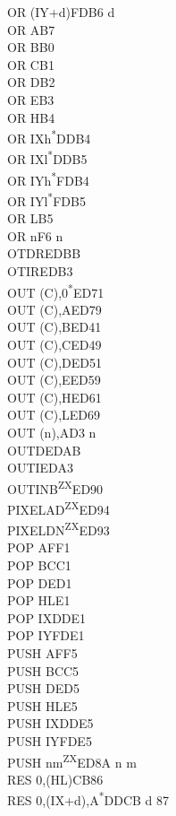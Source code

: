 \documentclass[oneside,a4paper]{book}
\begin{document}
\begin{multicols}{3}
{\begin{tabbing}
OR (IY+d)\>FDB6 d\\
OR A\>B7\\
OR B\>B0\\
OR C\>B1\\
OR D\>B2\\
OR E\>B3\\
OR H\>B4\\
OR IXh\textsuperscript{*}\>DDB4\\
OR IXl\textsuperscript{*}\>DDB5\\
OR IYh\textsuperscript{*}\>FDB4\\
OR IYl\textsuperscript{*}\>FDB5\\
OR L\>B5\\
OR n\>F6 n\\
OTDR\>EDBB\\
OTIR\>EDB3\\
OUT (C),0\textsuperscript{*}\>ED71\\
OUT (C),A\>ED79\\
OUT (C),B\>ED41\\
OUT (C),C\>ED49\\
OUT (C),D\>ED51\\
OUT (C),E\>ED59\\
OUT (C),H\>ED61\\
OUT (C),L\>ED69\\
OUT (n),A\>D3 n\\
OUTD\>EDAB\\
OUTI\>EDA3\\
OUTINB\textsuperscript{ZX}\>ED90\\
PIXELAD\textsuperscript{ZX}\>ED94\\
PIXELDN\textsuperscript{ZX}\>ED93\\
POP AF\>F1\\
POP BC\>C1\\
POP DE\>D1\\
POP HL\>E1\\
POP IX\>DDE1\\
POP IY\>FDE1\\
PUSH AF\>F5\\
PUSH BC\>C5\\
PUSH DE\>D5\\
PUSH HL\>E5\\
PUSH IX\>DDE5\\
PUSH IY\>FDE5\\
PUSH nm\textsuperscript{ZX}\>ED8A n m\\
RES 0,(HL)\>CB86\\
RES 0,(IX+d),A\textsuperscript{*}\>DDCB d 87\\

\end{tabbing}}
\end{multicols}
\end{document}
